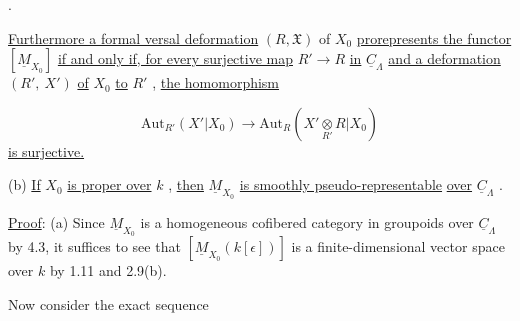 \begin{center}
\quad .
\end{center}
\underline{Furthermore a formal versal deformation}  $(R,\mathfrak{X})$  of  $X_{0}$  \underline{prorepresents the functor} $[\underline{M}_{X_{0}}]$  \underline{if and only if, for every surjective map}  $R' \to R$  \underline{in}  $\underline{C}_{\Lambda}$  \underline{and a deformation} $(R',\ X')$  \underline{of}  $X_{0}$  \underline{to}  $R'$ , \underline{the homomorphism}

\begin{equation*}
\mathrm{Aut}_{R'}(X'|X_{0}) \to \mathrm{Aut}_{R}(X' \underset{R'}{\otimes} R|X_{0})
\end{equation*}
\underline{is surjective.}

(b)  \underline{If}  $X_{0}$  \underline{is proper over}  $k$ , \underline{then}  $\underline{M}_{X_{0}}$  \underline{is smoothly pseudo-representable}
\underline{over} $\underline{C}_{\Lambda}$ .

\underline{Proof}:  (a)  Since  $\underline{M}_{X_{0}}$  is a homogeneous cofibered category in groupoids over $\underline{C}_{\Lambda}$ by 4.3, it suffices to see that  $[\underline{M}_{X_{0}}(k[\epsilon])]$  is a finite-dimensional vector space over  $k$  by 1.11 and 2.9(b).

Now consider the exact sequence

